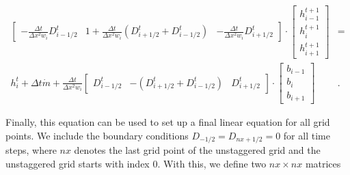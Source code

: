 \documentclass[journal abbreviation, manuscript]{copernicus}
\begin{document}
\begin{equation}
\begin{aligned}
     \begin{bmatrix}
     - \frac{\Delta t}{\Delta x^2 w_i} D_{i-1/2}^{t} &
     1 + \frac{\Delta t}{\Delta x^2 w_i} (D_{i+1/2}^{t} + D_{i-1/2}^{t}) & 
     - \frac{\Delta t}{\Delta x^2 w_i} D_{i+1/2}^{t}
     \end{bmatrix}
     \cdot
     \begin{bmatrix}
     h_{i-1}^{t+1} \\
     h_{i}^{t+1} \\
     h_{i+1}^{t+1}
     \end{bmatrix}& = \\
     h_{i}^{t} + \Delta t \Dot{m} + \frac{\Delta t}{\Delta x^2 w_i}
     \begin{bmatrix}
     D_{i-1/2}^{t} &
     -(D_{i+1/2}^{t} + D_{i-1/2}^{t}) &
     D_{i+1/2}^{t}
     \end{bmatrix}
     \cdot
     \begin{bmatrix}
     b_{i-1} \\
     b_{i} \\
     b_{i+1}
     \end{bmatrix}&.
\end{aligned}
\end{equation}

Finally, this equation can be used to set up a final linear equation for all grid points. We include the boundary conditions $D_{-1/2} = D_{nx + 1/2} = 0$ for all time steps, where $nx$ denotes the last grid point of the unstaggered grid and the unstaggered grid starts with index 0. With this, we define two $nx \times nx$ matrices
\end{document}
